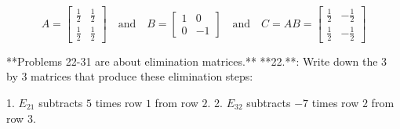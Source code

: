 \[A=\begin{bmatrix}\frac{1}{2}&\frac{1}{2}\\ \frac{1}{2}&\frac{1}{2}\end{bmatrix}\quad\text{and}\quad B=\begin{bmatrix}1&0 \\ 0&-1\end{bmatrix}\quad\text{and}\quad C=AB=\begin{bmatrix}\frac{1}{2}&-\frac{1} {2}\\ \frac{1}{2}&-\frac{1}{2}\end{bmatrix}\]

**Problems 22-31 are about elimination matrices.**
**22.**: Write down the \(3\) by \(3\) matrices that produce these elimination steps:

1. \(E_{21}\) subtracts \(5\) times row \(1\) from row \(2\).
2. \(E_{32}\) subtracts \(-7\) times row \(2\) from row \(3\).

